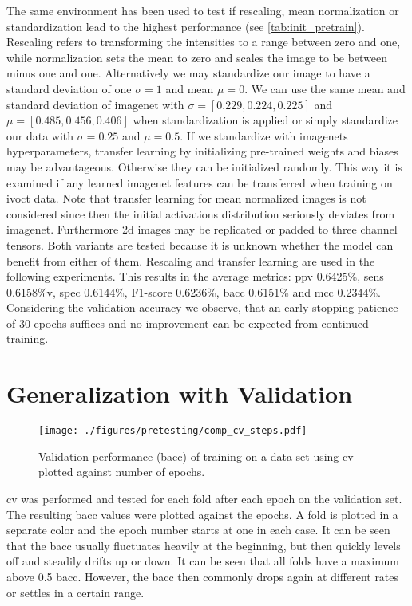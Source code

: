 The same environment has been used to test if rescaling, mean normalization or standardization lead to the highest performance (see \cref{tab:init_pretrain}). Rescaling refers to transforming the intensities to a range between zero and one, while normalization sets the mean to zero and scales the image to be between minus one and one. Alternatively we may standardize our image to have a standard deviation of one \( \sigma = 1 \) and mean \( \mu = 0 \). We can use the same mean and standard deviation of \gls{imagenet} with \( \sigma = [0.229, 0.224, 0.225] \) and \( \mu = [0.485, 0.456, 0.406] \) when standardization is applied or simply standardize our data with \( \sigma = 0.25 \) and \( \mu = 0.5 \). If we standardize with \glspl{imagenet} hyperparameters, transfer learning by initializing pre-trained weights and biases may be advantageous. Otherwise they can be initialized randomly. This way it is examined if any learned \gls{imagenet} features can be transferred when training on \acrshort{ivoct} data. Note that transfer learning for mean normalized images is not considered since then the initial activations distribution seriously deviates from \gls{imagenet}. Furthermore \acrshort{2d} images may be replicated or padded to three channel tensors. Both variants are tested because it is unknown whether the model can benefit from either of them. Rescaling and transfer learning are used in the following experiments. This results in the average metrics: \acrshort{ppv} 0.6425\%, \acrshort{sens} 0.6158\%v, \acrshort{spec} 0.6144\%, F1-score 0.6236\%, \acrshort{bacc} 0.6151\% and \acrshort{mcc} 0.2344\%. Considering the validation accuracy we observe, that an early stopping patience of 30 epochs suffices and no improvement can be expected from continued training.


\section{Generalization with Validation}

\begin{figure}[H]
    \centering
    \texttt{[image: ./figures/pretesting/comp\_cv\_steps.pdf]}
    \caption[Validation performance \acrshort{cv}]{Validation performance (\acrshort{bacc}) of training on a data set using \acrshort{cv} plotted against number of epochs.}
    \label{fig:cv_steps}
\end{figure}
\Acrshort{cv} was performed and tested for each fold after each epoch on the validation set. The resulting \acrshort{bacc} values were plotted against the epochs. A fold is plotted in a separate color and the epoch number starts at one in each case. It can be seen that the \acrshort{bacc} usually fluctuates heavily at the beginning, but then quickly levels off and steadily drifts up or down. It can be seen that all folds have a maximum above 0.5 \acrshort{bacc}. However, the \acrshort{bacc} then commonly drops again at different rates or settles in a certain range.

